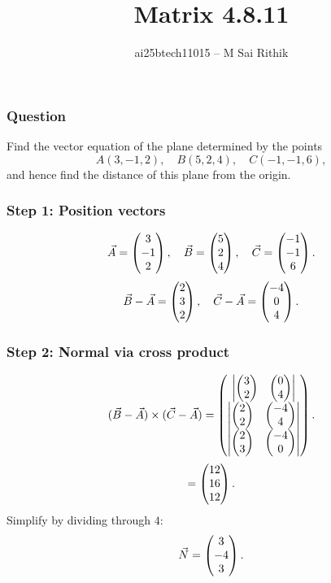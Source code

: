 \documentclass{beamer}
\title{Matrix 4.8.11}
\author{ai25btech11015 -- M Sai Rithik}
\date{}
\begin{document}
\frame{\titlepage}

\begin{frame}
\frametitle{Question}
Find the vector equation of the plane determined by the points
\[
A(3,-1,2),\quad B(5,2,4),\quad C(-1,-1,6),
\]
and hence find the distance of this plane from the origin.  

\end{frame}

\begin{frame}
\frametitle{Step 1: Position vectors}
\begin{equation}
\Vec{A} = \begin{pmatrix}3 \\ -1 \\ 2\end{pmatrix},\quad
\Vec{B} = \begin{pmatrix}5 \\ 2 \\ 4\end{pmatrix},\quad
\Vec{C} = \begin{pmatrix}-1 \\ -1 \\ 6\end{pmatrix}.
\end{equation}
\pause
\begin{equation}
\Vec{B}-\Vec{A} = \begin{pmatrix}2 \\ 3 \\ 2\end{pmatrix},\quad
\Vec{C}-\Vec{A} = \begin{pmatrix}-4 \\ 0 \\ 4\end{pmatrix}.
\end{equation}
\end{frame}

\begin{frame}
\frametitle{Step 2: Normal via cross product}
\begin{equation}
(\Vec{B}-\Vec{A}) \times (\Vec{C}-\Vec{A})
= \begin{pmatrix}
  \begin{vmatrix}\begin{pmatrix}3\\2\end{pmatrix} & \begin{pmatrix}0\\4\end{pmatrix}\end{vmatrix} \\[1ex]
  \begin{vmatrix}\begin{pmatrix}2\\2\end{pmatrix} & \begin{pmatrix}-4\\4\end{pmatrix}\end{vmatrix} \\[1ex]
  \begin{vmatrix}\begin{pmatrix}2\\3\end{pmatrix} & \begin{pmatrix}-4\\0\end{pmatrix}\end{vmatrix}
\end{pmatrix}.
\end{equation}
\pause
\begin{equation}
= \begin{pmatrix}12 \\ 16 \\ 12\end{pmatrix}.
\end{equation}
\pause
Simplify by dividing through $4$:
\begin{equation}
\Vec{N} = \begin{pmatrix}3 \\ -4 \\ 3\end{pmatrix}.
\end{equation}
\end{frame}
\end{document}
